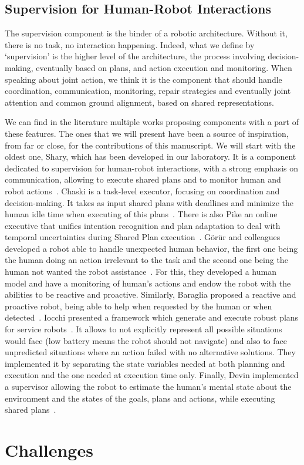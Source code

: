 \documentclass[a4paper,11pt,twoside]{StyleThese}
\begin{document}
\subsection{Supervision for Human-Robot Interactions}\label{chap1:subsec:state_art_sup}
The supervision component is the binder of a robotic architecture. Without it, there is no task, no interaction happening. Indeed, what we define by `supervision' is the higher level of the architecture, the process involving decision-making, eventually based on plans, and action execution and monitoring. When speaking about joint action, we think it is the component that should handle coordination, communication, monitoring, repair strategies and eventually joint attention and common ground alignment, based on shared representations.

We can find in the literature multiple works proposing components with a part of these features. The ones that we will present have been a source of inspiration, from far or close, for the contributions of this manuscript. We will start with the oldest one, Shary, which has been developed in our laboratory. It is a component dedicated to supervision for human-robot interactions, with a strong emphasis on communication, allowing to execute shared plans and to monitor human and robot actions~\cite{clodic_2009_shary}. Chaski is a task-level executor, focusing on coordination and decision-making. It takes as input shared plans with deadlines and minimize the human idle time when executing of this plans~\cite{shah_2011_improved}. There is also Pike an online executive that unifies intention recognition and plan adaptation to deal with temporal uncertainties during Shared Plan execution~\cite{karpas_2015_robust}. G\"{o}r\"{u}r and colleagues developed a robot able to handle unexpected human behavior, the first one being the human doing an action irrelevant to the task and the second one being the human not wanted the robot assistance~\cite{gorur_2017_toward, gorur_2018_social}. For this, they developed a human model and have a monitoring of human's actions and endow the robot with the abilities to be reactive and proactive. Similarly, Baraglia \etal{} proposed a reactive and proactive robot, being able to help when requested by the human or when detected~\cite{baraglia_2017_efficient}. Iocchi \etal{} presented a framework which generate and execute robust plans for service robots~\cite{iocchi_2016_practical}. It allows to not explicitly represent all possible situations would face (\eg low battery means the robot should not navigate) and also to face unpredicted situations where an action failed with no alternative solutions. They implemented it by separating the state variables needed at both planning and execution and the one needed at execution time only. Finally, Devin \etal{} implemented a supervisor allowing the robot to estimate the human's mental state about the environment and the states of the goals, plans and actions, while executing shared plans~\cite{devin_2016_implemented}.


\section{Challenges}




\ifdefined{}
\else


\end{document}
